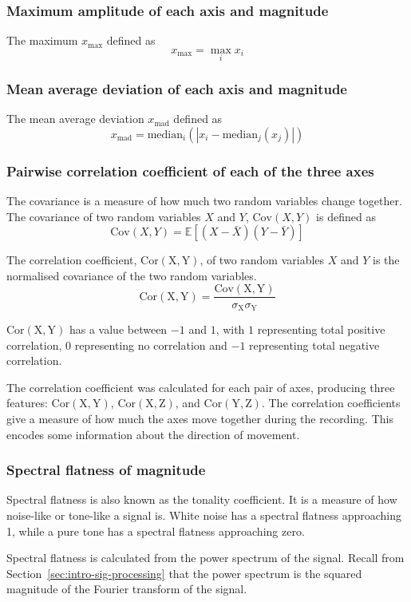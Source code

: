       \subsubsection{Maximum amplitude of each axis and magnitude}
        The maximum $x_{\max}$ defined as $$x_{\max} = \max_i x_i $$
      \subsubsection{Mean average deviation of each axis and magnitude}
        The mean average deviation $x_\mathrm{mad}$ defined as $$x_\mathrm{mad} = \mathrm{median}_i (|x_i - \mathrm{median}_j(x_j)|)$$
      \subsubsection{Pairwise correlation coefficient of each of the three axes}
        The covariance is a measure of how much two random variables change together. The covariance of two random variables $X$ and $Y$, $\mathrm{Cov}(X, Y)$ is defined as $$\mathrm{Cov}(X, Y) = \mathbb{E}[(X - \bar{X})(Y - \bar{Y})]$$
        
        The correlation coefficient, $\mathrm{Cor(X,Y)}$, of two random variables $X$ and $Y$ is the normalised covariance of the two random variables. $$\mathrm{Cor(X,Y)} = \frac{\mathrm{Cov(X,Y)}}{\sigma_{\mathrm{X}}\sigma_{\mathrm{Y}}}$$
        
        $\mathrm{Cor(X,Y)}$ has a value between $-1$ and $1$, with $1$ representing total positive correlation, $0$ representing no correlation and $-1$ representing total negative correlation.
         
        The correlation coefficient was calculated for each pair of axes, producing three features: $\mathrm{Cor(X,Y)}$, $\mathrm{Cor(X,Z)}$, and $\mathrm{Cor(Y,Z)}$. The correlation coefficients give a measure of how much the axes move together during the recording. This encodes some information about the direction of movement.
      \subsubsection{Spectral flatness of magnitude}
        Spectral flatness is also known as the tonality coefficient. It is a measure of how noise-like or tone-like a signal is. White noise has a spectral flatness approaching 1, while a pure tone has a spectral flatness approaching zero.
        
        Spectral flatness is calculated from the power spectrum of the signal. Recall from Section~\ref{sec:intro-sig-processing} that the power spectrum is the squared magnitude of the Fourier transform of the signal.
        
